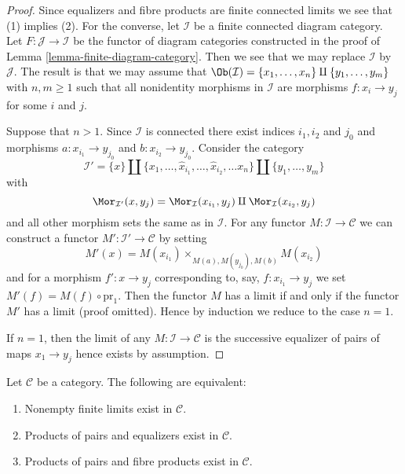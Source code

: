 \begin{proof}
Since equalizers and fibre products are finite connected
limits we see that (1) implies (2). For the converse, let $\mathcal{I}$
be a finite connected diagram category. Let
$F : \mathcal{J} \to \mathcal{I}$
be the functor of diagram categories constructed in the proof of
Lemma \ref{lemma-finite-diagram-category}.
Then we see that we may replace $\mathcal{I}$ by $\mathcal{J}$.
The result is that we may assume that
$\Ob(\mathcal{I}) = \{x_1, \ldots, x_n\} \amalg \{y_1, \ldots, y_m\}$
with $n, m \geq 1$ such that all nonidentity morphisms in $\mathcal{I}$
are morphisms $f : x_i \to y_j$ for some $i$ and $j$.

\medskip\noindent
Suppose that $n > 1$. Since $\mathcal{I}$ is connected there
exist indices $i_1, i_2$ and $j_0$ and morphisms $a : x_{i_1} \to y_{j_0}$
and $b : x_{i_2} \to y_{j_0}$. Consider the category
$$
\mathcal{I}' =
\{x\} \amalg \{x_1, \ldots, \hat x_{i_1}, \ldots, \hat x_{i_2}, \ldots x_n\}
\amalg \{y_1, \ldots, y_m\}
$$
with
$$
\Mor_{\mathcal{I}'}(x, y_j) = \Mor_\mathcal{I}(x_{i_1}, y_j)
\amalg \Mor_\mathcal{I}(x_{i_2}, y_j)
$$
and all other morphism sets the same as in $\mathcal{I}$. For any functor
$M : \mathcal{I} \to \mathcal{C}$ we can construct a functor
$M' : \mathcal{I}' \to \mathcal{C}$ by setting
$$
M'(x) = M(x_{i_1}) \times_{M(a), M(y_{j_0}), M(b)} M(x_{i_2})
$$
and for a morphism $f' : x \to y_j$ corresponding to, say,
$f : x_{i_1} \to y_j$ we set $M'(f) = M(f) \circ \text{pr}_1$.
Then the functor $M$ has a limit if and only if the functor $M'$ has
a limit (proof omitted). Hence by induction we reduce to the case $n = 1$.

\medskip\noindent
If $n = 1$, then the limit of any $M : \mathcal{I} \to \mathcal{C}$ is
the successive equalizer of pairs of maps $x_1 \to y_j$ hence
exists by assumption.
\end{proof}

\begin{lemma}
\label{lemma-almost-finite-limits-exist}
Let $\mathcal{C}$ be a category.
The following are equivalent:
\begin{enumerate}
\item Nonempty finite limits exist in $\mathcal{C}$.
\item Products of pairs and equalizers exist in $\mathcal{C}$.
\item Products of pairs and fibre products exist in $\mathcal{C}$.
\end{enumerate}
\end{lemma}

